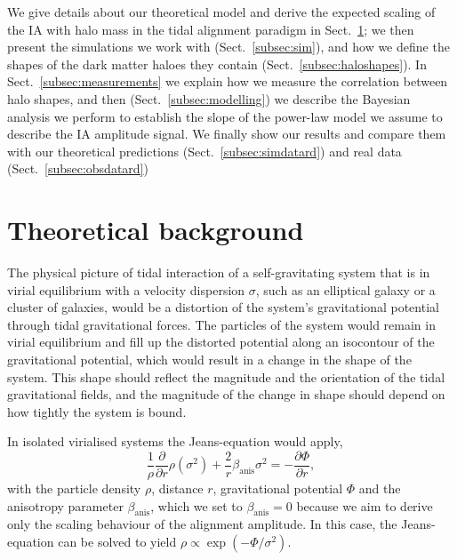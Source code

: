 \documentclass[a4paper,11pt]{article}
\begin{document}
We give details about our theoretical model and derive the expected scaling of the IA with halo mass in the tidal alignment paradigm in Sect.~\ref{sec:theory}; we then present the simulations we work with (Sect.~\ref{subsec:sim}), and how we define the shapes of the dark matter haloes they contain (Sect.~\ref{subsec:haloshapes}). In Sect.~\ref{subsec:measurements} we explain how we measure the correlation between halo shapes, and then (Sect.~\ref{subsec:modelling}) we describe the Bayesian analysis we perform to establish the slope of the power-law model we assume to describe the IA amplitude signal. We finally show our results and compare them with our theoretical predictions (Sect.~\ref{subsec:simdatard}) and real data (Sect.~\ref{subsec:obsdatard}) 

\section{Theoretical background}
\label{sec:theory}
The physical picture of tidal interaction of a self-gravitating system that is in virial equilibrium with a velocity dispersion $\sigma$, such as an elliptical galaxy or a cluster of galaxies, would be a distortion of the system's gravitational potential through tidal gravitational forces. The particles of the system would remain in virial equilibrium and fill up the distorted potential along an isocontour of the gravitational potential, which would result in a change in the shape of the system. This shape should reflect the magnitude and the orientation of the tidal gravitational fields, and the magnitude of the change in shape should depend on how tightly the system is bound.

In isolated virialised systems the Jeans-equation would apply,
\begin{equation}
\frac{1}{\rho}\frac{\partial}{\partial r}\rho(\sigma^2) + \frac{2}{r}\beta_{\mathrm{anis}}\sigma^2 = 
-\frac{\partial\Phi}{\partial r},
\end{equation}
with the particle density $\rho$, distance $r$, gravitational potential $\Phi$ and the anisotropy parameter $\beta_{\mathrm{anis}}$, which we set to $\beta_{\mathrm{anis}}=0$ because we aim to derive only the scaling behaviour of the alignment amplitude. In this case, the Jeans-equation can be solved to yield $\rho\propto\exp(-\Phi/\sigma^2)$.
\end{document}
